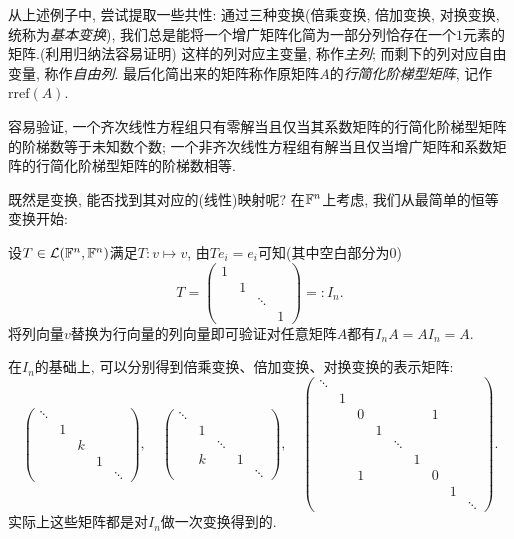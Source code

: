 从上述例子中, 尝试提取一些共性: 通过三种变换(倍乘变换, 倍加变换, 对换变换, 统称为\textit{基本变换}), 我们总是能将一个增广矩阵化简为一部分列恰存在一个$1$元素的矩阵.(利用归纳法容易证明) 这样的列对应主变量, 称作\textit{主列}; 而剩下的列对应自由变量, 称作\textit{自由列}. 最后化简出来的矩阵称作原矩阵$A$的\textit{行简化阶梯型矩阵}, 记作$\textrm{rref}(A)$. 

容易验证, 一个齐次线性方程组只有零解当且仅当其系数矩阵的行简化阶梯型矩阵的阶梯数等于未知数个数; 一个非齐次线性方程组有解当且仅当增广矩阵和系数矩阵的行简化阶梯型矩阵的阶梯数相等. 

既然是变换, 能否找到其对应的(线性)映射呢? 在$\mathbb{F} ^n$上考虑, 我们从最简单的恒等变换开始: 

设$T \in \mathcal{L} (\mathbb{F} ^n,\mathbb{F} ^n)$满足$T:v \mapsto v$, 由$Te_i=e_i$可知(其中空白部分为$0$)$$T=\left( \begin{smallmatrix}
	 1 &   &   &   \\
	   & 1 &   &   \\
	   &   &\ddots &   \\
	   &   &   & 1     
\end{smallmatrix} \right) =: I_n.$$
将列向量$v$替换为行向量的列向量即可验证对任意矩阵$A$都有$I_nA=AI_n=A$. 

在$I_n$的基础上, 可以分别得到倍乘变换、倍加变换、对换变换的表示矩阵:$$\left( \begin{smallmatrix}
	\ddots &   &   &  &   \\
	       & 1 &   &  &   \\
	       &   &k  &  &   \\
	       &   &   & 1&   \\
	       &   &   &  &\ddots  
\end{smallmatrix} \right),\quad \left( \begin{smallmatrix}
	\ddots &   &       &  &   \\
	       & 1 &       &  &   \\
	       &   &\ddots &  &   \\
	       & k &       & 1&   \\
	       &   &       &  &\ddots  
\end{smallmatrix} \right),\quad \left( \begin{smallmatrix}
	\ddots &   &   &   &   &   &   &   &   \\
	       & 1 &   &   &   &   &   &   &   \\
	       &   & 0 &   &   &   & 1 &   &   \\
	       &   &   & 1 &   &   &   &   &   \\
	       &   &   &   & \ddots  &   &   &   &   \\
	       &   &   &   &   & 1 &   &   &   \\
	       &   & 1 &   &   &   & 0 &   &   \\
	       &   &   &   &   &   &   & 1 &   \\
	       &   &   &   &   &   &   &   & \ddots
\end{smallmatrix} \right).$$实际上这些矩阵都是对$I_n$做一次变换得到的. 

